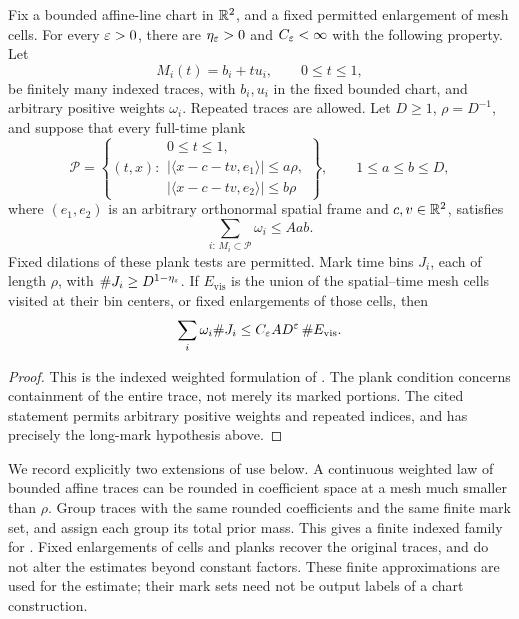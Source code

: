 \begin{lemma}
\label{lem:weighted-planks}
Fix a bounded affine-line chart in \(\mathbb R^2\), and a fixed
permitted enlargement of mesh cells.
For every \(\varepsilon>0\), there are \(\eta_\varepsilon>0\) and
\(C_\varepsilon<\infty\) with the following property.
Let
\[
 M_i(t)=b_i+tu_i,\qquad 0\le t\le1,
\]
be finitely many indexed traces, with \(b_i,u_i\) in the
fixed bounded chart, and arbitrary positive weights
\(\omega_i\).  Repeated traces are allowed.
Let \(D\ge1\), \(\rho=D^{-1}\), and suppose that every
full-time plank
\[
 \mathcal P=\left\{(t,x):
 \begin{array}{l}
 0\le t\le1,\\
 |\langle x-c-tv,e_1\rangle|\le a\rho,\\
 |\langle x-c-tv,e_2\rangle|\le b\rho
 \end{array}\right\},
 \qquad 1\le a\le b\le D,
\]
where \((e_1,e_2)\) is an arbitrary orthonormal spatial
frame and \(c,v\in\mathbb R^2\), satisfies
\begin{equation}
 \sum_{i:\,M_i\subset\mathcal P}\omega_i\le Aab.
 \label{a01:weighted-plank-cap}
\end{equation}
Fixed dilations of these plank tests are permitted.
Mark time bins \(J_i\), each of length \(\rho\), with
\(\#J_i\ge D^{1-\eta_\varepsilon}\).
If \(E_{\mathrm{vis}}\) is the union of the spatial--time
mesh cells visited at their bin centers, or fixed
enlargements of those cells, then
\begin{equation}
 \sum_i\omega_i\#J_i
 \le C_\varepsilon A D^\varepsilon\,\#E_{\mathrm{vis}}.
 \label{a01:weighted-plank-conclusion}
\end{equation}
\end{lemma}

\begin{proof}
This is the indexed weighted formulation of
\citet[Lemma~2.3]{ThreeDimensional}.
The plank condition concerns containment of the entire
trace, not merely its marked portions.
The cited statement permits arbitrary positive weights
and repeated indices, and has precisely the long-mark
hypothesis above.
\end{proof}

We record explicitly two extensions of use below.
A continuous weighted law of bounded affine traces can be
rounded in coefficient space at a mesh much smaller than
\(\rho\).  Group traces with the same rounded coefficients
and the same finite mark set, and assign each group its
total prior mass.  This gives a finite indexed family for
.  Fixed enlargements of cells and
planks recover the original traces, and do not alter the
estimates beyond constant factors.  These finite
approximations are used for the estimate; their mark
sets need not be output labels of a chart construction.


